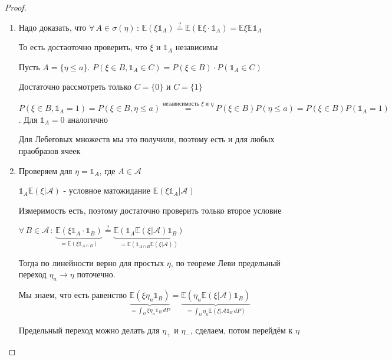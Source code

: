 \begin{proof}
    \begin{enumerate}
        \item {
            Надо доказать, что $\forall \, A \in \sigma(\eta) \, : \, \mathbb{E} (\xi \mathds{1}_A) \overset{?}{=} \mathbb{E} (\mathbb{E} \xi \cdot \mathds{1}_A) =
            \mathbb{E} \xi \mathbb{E} \mathds{1}_A$

            То есть достаоточно проверить, что $\xi$ и $\mathds{1}_A$ независимы

            Пусть $A = \{ \eta \leqslant a \}$. $P(\xi \in B, \mathds{1}_A \in C) = P(\xi \in B) \cdot P(\mathds{1}_A \in C)$

            Достаточно рассмотреть только $C = \{ 0 \}$ и $C = \{ 1 \}$

            $P (\xi \in B, \mathds{1}_A = 1) = P(\xi \in B, \eta \leqslant a) \overset{\text{независимость $\xi$ и $\eta$}}{=} P(\xi \in B) P(\eta \leqslant a) = P(\xi \in B) P(\mathds{1}_A = 1)$. Для $\mathds{1}_A = 0$ аналогично

            Для Лебеговых множеств мы это получили, поэтому есть и для любых праобразов ячеек
        }
        \item {
            Проверяем для $\eta = \mathds{1}_A$, где $A \in \mathcal{A}$

            $\mathds{1}_A \mathbb{E} (\xi | \mathcal{A})$ - условное матожидание $\mathbb{E} (\xi \mathds{1}_A | \mathcal{A})$

            Измеримость есть, поэтому достаточно проверить только второе условие

            $\forall \, B \in \mathcal{A} \, : \, \underbrace{\mathbb{E} (\xi \mathds{1}_A \cdot \mathds{1}_B)}_{=\mathbb{E} (\xi \mathds{1}_{A \cap B})} \overset{?}{=} \underbrace{\mathbb{E} (\mathds{1}_A \mathbb{E} (\xi | \mathcal{A}) \mathds{1}_B)}_{=\mathbb{E} (\mathds{1}_{A \cap B} \mathbb{E} (\xi | \mathcal{A}))}$

            Тогда по линейности верно для простых $\eta$, по теореме Леви предельный переход $\eta_n \rightarrow \eta$ поточечно. 

            Мы знаем, что есть равенство $\underbrace{\mathbb{E} (\xi \eta_n \mathds{1}_B)}_{=\int_{\Omega} \xi \eta_n \mathds{1}_B \, dP} = \underbrace{\mathbb{E} (\eta_n \mathbb{E} (\xi | \mathcal{A}) \mathds{1}_B)}_{=\int_{\Omega} \eta_n \mathbb{E} (\xi | \mathcal{A} \mathds{1}_B \, dP)}$

            Предельный переход можно делать для $\eta_+$ и $\eta_-$, сделаем, потом перейдём к $\eta$
        }
    \end{enumerate}
\end{proof}

